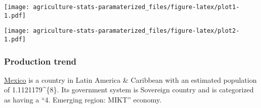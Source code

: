 \documentclass[]{article}
\begin{document}
\texttt{[image: agriculture-stats-paramaterized\_files/figure-latex/plot1-1.pdf]}

\texttt{[image: agriculture-stats-paramaterized\_files/figure-latex/plot2-1.pdf]}

\hypertarget{production-trend}{%
\subsubsection{Production trend}\label{production-trend}}

\href{https://en.wikipedia.org/wiki/Mexico}{Mexico} is a country in
Latin America \& Caribbean with an estimated population of
1.1121179\^{}\{8\}. Its government system is Sovereign country
and is categorized as having a ``4. Emerging region: MIKT'' economy.
\end{document}
